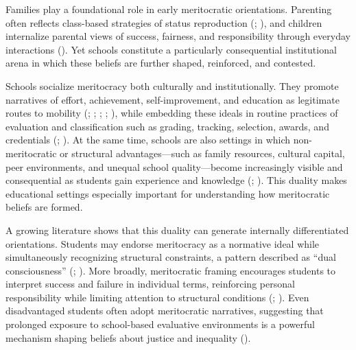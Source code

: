 \documentclass[
  13pt,
]{article}
\begin{document}
Families play a foundational role in early meritocratic orientations.
Parenting often reflects class-based strategies of status reproduction
(;
),
and children internalize parental views of success, fairness, and
responsibility through everyday interactions
(). Yet schools
constitute a particularly consequential institutional arena in which
these beliefs are further shaped, reinforced, and contested.

Schools socialize meritocracy both culturally and institutionally. They
promote narratives of effort, achievement, self-improvement, and
education as legitimate routes to mobility
(;
;
;
;
), while
embedding these ideals in routine practices of evaluation and
classification such as grading, tracking, selection, awards, and
credentials (;
). At the same
time, schools are also settings in which non-meritocratic or structural
advantages---such as family resources, cultural capital, peer
environments, and unequal school quality---become increasingly visible
and consequential as students gain experience and knowledge
(;
). This duality
makes educational settings especially important for understanding how
meritocratic beliefs are formed.

A growing literature shows that this duality can generate internally
differentiated orientations. Students may endorse meritocracy as a
normative ideal while simultaneously recognizing structural constraints,
a pattern described as ``dual consciousness''
(;
). More broadly,
meritocratic framing encourages students to interpret success and
failure in individual terms, reinforcing personal responsibility while
limiting attention to structural conditions
(;
). Even
disadvantaged students often adopt meritocratic narratives, suggesting
that prolonged exposure to school-based evaluative environments is a
powerful mechanism shaping beliefs about justice and inequality
().
\end{document}
